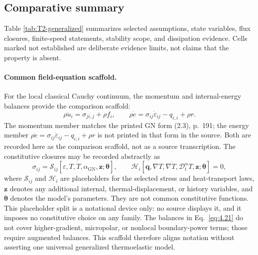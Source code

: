 \subsection{Comparative summary}
\label{sec:4.12}

Table \ref{tab:T2-generalized} summarizes selected assumptions, state variables, flux closures, finite-speed statements, stability scope, and dissipation evidence. Cells marked not established are deliberate evidence limits, not claims that the property is absent.

\paragraph{Common field-equation scaffold.}
For the local classical Cauchy continuum, the momentum and internal-energy balances provide the comparison scaffold:
\begin{equation}
\rho\ddot{u}_i=\sigma_{ji,j}+\rho f_i,
\qquad
\rho\dot e=\sigma_{ij}\dot\varepsilon_{ij}-q_{i,i}+\rho r.
\label{eq:4.21}
\end{equation}
The momentum member matches the printed GN form (2.3), p.~191; the energy member $\rho\dot e=\sigma_{ij}\dot\varepsilon_{ij}-q_{i,i}+\rho r$ is not printed in that form in the source. Both are recorded here as the comparison scaffold, not as a source transcription.
The constitutive closures may be recorded abstractly as
\begin{equation}
\sigma_{ij}=\mathcal{S}_{ij}[\varepsilon,T,\dot T,\alpha_{\mathrm{GN}},\bm z;\bm\theta],
\qquad
\mathcal{H}_i[\bm q,\nabla T,\nabla\dot T,\mathcal{D}_t^\alpha T,\bm z;\bm\theta]=0,
\label{eq:4.22}
\end{equation}
where $\mathcal{S}_{ij}$ and $\mathcal{H}_i$ are placeholders for the selected stress and heat-transport laws, $\bm z$ denotes any additional internal, thermal-displacement, or history variables, and $\bm\theta$ denotes the model's parameters. They are not common constitutive functions. This placeholder split is a notational device only: no source displays it, and it imposes no constitutive choice on any family. The balances in Eq.~\eqref{eq:4.21} do not cover higher-gradient, micropolar, or nonlocal boundary-power terms; those require augmented balances. This scaffold therefore aligns notation without asserting one universal generalized thermoelastic model.





